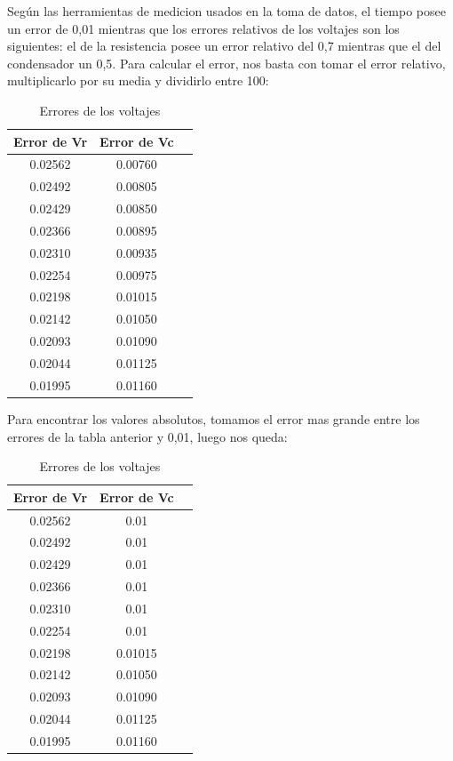 \documentclass{article}
\begin{document}
Según las herramientas de medicion usados en la toma de datos, el tiempo posee un error de 0,01 mientras que los errores relativos de los voltajes son los siguientes: el de la resistencia posee un error relativo del 0,7 mientras que el del condensador un 0,5.
Para calcular el error, nos basta con tomar el error relativo, multiplicarlo por su media y dividirlo entre 100:

\begin{table}[H]
    \centering
    \begin{tabular}{ccc}
    \hline
        Error de Vr & Error de Vc \\ \hline
        0.02562  & 0.00760 \\ \hline
        0.02492  & 0.00805 \\ \hline
        0.02429 & 0.00850 \\ \hline
        0.02366 & 0.00895  \\ \hline
        0.02310 & 0.00935 \\ \hline
        0.02254 & 0.00975 \\ \hline
        0.02198 & 0.01015 \\ \hline
        0.02142 & 0.01050 \\ \hline
        0.02093 & 0.01090 \\ \hline
        0.02044 & 0.01125 \\ \hline
        0.01995 & 0.01160 \\ \hline
    \end{tabular}
    \caption{Errores de los voltajes}
\end{table}

Para encontrar los valores absolutos, tomamos el error mas grande entre los errores de la tabla anterior y 0,01, luego nos queda:


\begin{table}[H]
    \centering
    \begin{tabular}{ccc}
    \hline
        Error de Vr & Error de Vc \\ \hline
        0.02562  & 0.01 \\ \hline
        0.02492  & 0.01 \\ \hline
        0.02429 & 0.01 \\ \hline
        0.02366 & 0.01  \\ \hline
        0.02310 & 0.01 \\ \hline
        0.02254 & 0.01 \\ \hline
        0.02198 & 0.01015 \\ \hline
        0.02142 & 0.01050 \\ \hline
        0.02093 & 0.01090 \\ \hline
        0.02044 & 0.01125 \\ \hline
        0.01995 & 0.01160 \\ \hline
    \end{tabular}
    \caption{Errores de los voltajes}
\end{table}
\end{document}
